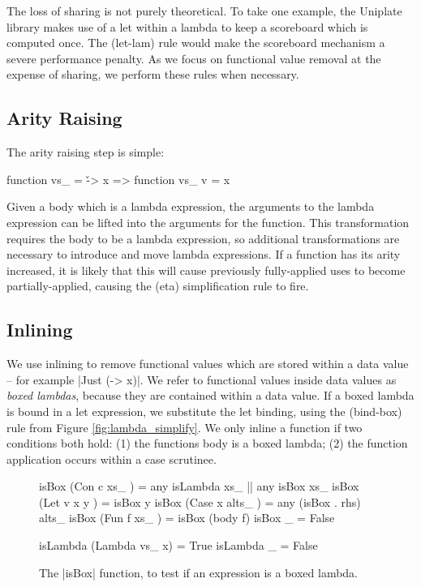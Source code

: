 \documentclass[preprint]{sigplanconf}
\begin{document}
The loss of sharing is not purely theoretical. To take one example, the Uniplate library \cite{me:uniplate} makes use of a let within a lambda to keep a scoreboard which is computed once. The (let-lam) rule would make the scoreboard mechanism a severe performance penalty. As we focus on functional value removal at the expense of sharing, we perform these rules when necessary.


\subsection{Arity Raising}

The arity raising step is simple:

\ignore\begin{code}
function vs_ = \v -> x
    => function vs_ v = x
\end{code}

Given a body which is a lambda expression, the arguments to the lambda expression can be lifted into the arguments for the function. This transformation requires the body to be a lambda expression, so additional transformations are necessary to introduce and move lambda expressions. If a function has its arity increased, it is likely that this will cause previously fully-applied uses to become partially-applied, causing the (eta) simplification rule to fire.


\subsection{Inlining}
\label{sec:inlining}

We use inlining to remove functional values which are stored within a data value -- for example |Just (\x -> x)|. We refer to functional values inside data values as \textit{boxed lambdas}, because they are contained within a data value. If a boxed lambda is bound in a let expression, we substitute the let binding, using the (bind-box) rule from Figure \ref{fig:lambda_simplify}. We only inline a function if two conditions both hold: (1) the functions body is a boxed lambda; (2) the function application occurs within a case scrutinee.

\begin{figure}
\begin{code}
isBox (Con c xs_     )  =  any isLambda xs_ ||  any isBox xs_
isBox (Let v x y     )  =  isBox y
isBox (Case x alts_  )  =  any (isBox . rhs) alts_
isBox (Fun f xs_     )  =  isBox (body f)
isBox _                 =  False

isLambda (Lambda vs_ x)  = True
isLambda _               = False
\end{code}
\caption{The |isBox| function, to test if an expression is a boxed lambda.}
\label{fig:boxed_lambda}
\end{figure}
\end{document}
